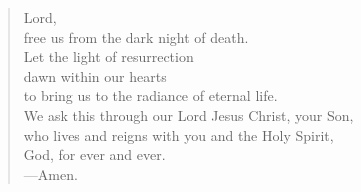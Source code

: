 \prayer

\setlength{\vleftmargin}{\prayerleftmargini}

\begin{verse}
Lord,\\
free us from the dark night of death.\\
Let the light of resurrection\\
dawn within our hearts\\
to bring us to the radiance of eternal life.\\
We ask this through our Lord Jesus Christ, your Son,\\
who lives and reigns with you and the Holy Spirit,\\
God, for ever and ever.\\
{\color{red}---\thinspace}Amen.
\end{verse}

\setlength{\vleftmargin}{\defleftmargini}
